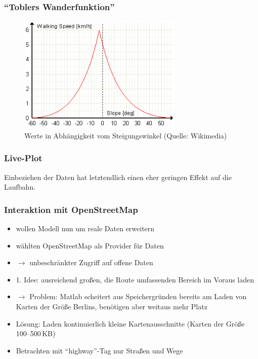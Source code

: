 \documentclass[aspectratio=43]{beamer}
\begin{document}
\begin{frame}
    \frametitle{\enquote{Toblers Wanderfunktion}}
    \begin{figure}[t]
        \centering
        \includegraphics[width=0.70\textwidth]{bilder/thf.png}
        \caption{Werte in Abhängigkeit vom Steigungswinkel (Quelle: Wikimedia)}
    \end{figure}
\end{frame}

\begin{frame}
    \frametitle{Live-Plot}
    \centering
    \pause
    Einbeziehen der Daten hat letztendlich einen eher geringen Effekt auf die Laufbahn.
\end{frame}

\begin{frame}
    \frametitle{Interaktion mit OpenStreetMap}
    \begin{itemize}
        \item wollen Modell nun um reale Daten erweitern
        \item wählten OpenStreetMap als Provider für Daten
        \item[]$\rightarrow$ unbeschränkter Zugriff auf offene Daten
        \item 1. Idee: ausreichend großen, die Route umfassenden Bereich im Voraus laden
        \item[]$\rightarrow$ Problem: Matlab scheitert aus Speichergründen bereits am
            Laden von Karten der Größe Berlins, benötigen aber weitaus mehr Platz
        \item Lösung: Laden kontinuierlich kleine Kartenausschnitte (Karten der Größe
            100--500\,KB)
        \item Betrachten mit \enquote{highway}-Tag nur Straßen und Wege
    \end{itemize}
\end{frame}
\end{document}
